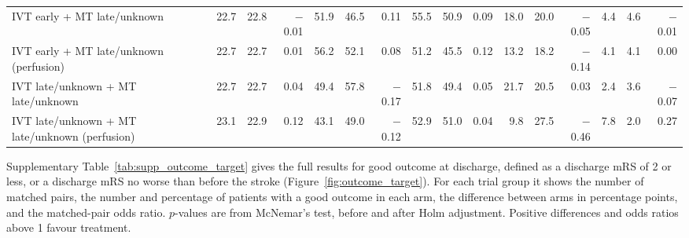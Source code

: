\begin{landscape}
\begin{longtable}{p{5.6cm}rrrrrrrrrrrrrrr}
IVT early + MT late/unknown & 22.7 & 22.8 & $-$0.01 & 51.9 & 46.5 & 0.11 & 55.5 & 50.9 & 0.09 & 18.0 & 20.0 & $-$0.05 & 4.4 & 4.6 & $-$0.01 \\
IVT early + MT late/unknown (perfusion) & 22.7 & 22.7 & 0.01 & 56.2 & 52.1 & 0.08 & 51.2 & 45.5 & 0.12 & 13.2 & 18.2 & $-$0.14 & 4.1 & 4.1 & 0.00 \\
IVT late/unknown + MT late/unknown & 22.7 & 22.7 & 0.04 & 49.4 & 57.8 & $-$0.17 & 51.8 & 49.4 & 0.05 & 21.7 & 20.5 & 0.03 & 2.4 & 3.6 & $-$0.07 \\
IVT late/unknown + MT late/unknown (perfusion) & 23.1 & 22.9 & 0.12 & 43.1 & 49.0 & $-$0.12 & 52.9 & 51.0 & 0.04 & 9.8 & 27.5 & $-$0.46 & 7.8 & 2.0 & 0.27 \\
\end{longtable}
\vspace{-0.5\baselineskip}
\clearpage

{\normalsize
Supplementary Table~\ref{tab:supp_outcome_target} gives the full results for good outcome at discharge, defined as a discharge mRS of 2 or less, or a discharge mRS no worse than before the stroke (Figure~\ref{fig:outcome_target}). For each trial group it shows the number of matched pairs, the number and percentage of patients with a good outcome in each arm, the difference between arms in percentage points, and the matched-pair odds ratio. $p$-values are from McNemar's test, before and after Holm adjustment. Positive differences and odds ratios above 1 favour treatment.
\par}
\bigskip


\end{landscape}
